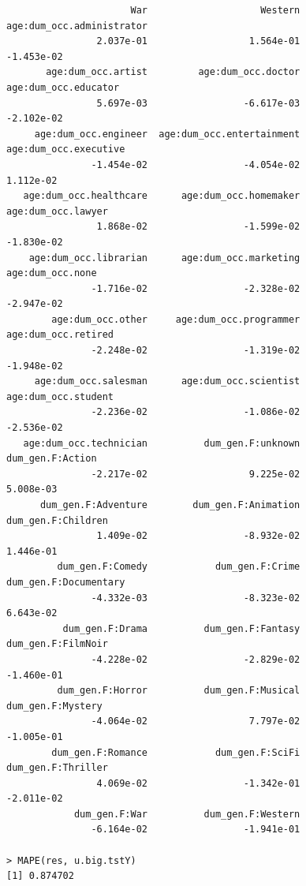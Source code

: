 \documentclass[11pt]{article}
\begin{document}
\begin{verbatim}
                      War                    Western  age:dum_occ.administrator  
                2.037e-01                  1.564e-01                 -1.453e-02  
       age:dum_occ.artist         age:dum_occ.doctor       age:dum_occ.educator  
                5.697e-03                 -6.617e-03                 -2.102e-02  
     age:dum_occ.engineer  age:dum_occ.entertainment      age:dum_occ.executive  
               -1.454e-02                 -4.054e-02                  1.112e-02  
   age:dum_occ.healthcare      age:dum_occ.homemaker         age:dum_occ.lawyer  
                1.868e-02                 -1.599e-02                 -1.830e-02  
    age:dum_occ.librarian      age:dum_occ.marketing           age:dum_occ.none  
               -1.716e-02                 -2.328e-02                 -2.947e-02  
        age:dum_occ.other     age:dum_occ.programmer        age:dum_occ.retired  
               -2.248e-02                 -1.319e-02                 -1.948e-02  
     age:dum_occ.salesman      age:dum_occ.scientist        age:dum_occ.student  
               -2.236e-02                 -1.086e-02                 -2.536e-02  
   age:dum_occ.technician          dum_gen.F:unknown           dum_gen.F:Action  
               -2.217e-02                  9.225e-02                  5.008e-03  
      dum_gen.F:Adventure        dum_gen.F:Animation         dum_gen.F:Children  
                1.409e-02                 -8.932e-02                  1.446e-01  
         dum_gen.F:Comedy            dum_gen.F:Crime      dum_gen.F:Documentary  
               -4.332e-03                 -8.323e-02                  6.643e-02  
          dum_gen.F:Drama          dum_gen.F:Fantasy         dum_gen.F:FilmNoir  
               -4.228e-02                 -2.829e-02                 -1.460e-01  
         dum_gen.F:Horror          dum_gen.F:Musical          dum_gen.F:Mystery  
               -4.064e-02                  7.797e-02                 -1.005e-01  
        dum_gen.F:Romance            dum_gen.F:SciFi         dum_gen.F:Thriller  
                4.069e-02                 -1.342e-01                 -2.011e-02  
            dum_gen.F:War          dum_gen.F:Western  
               -6.164e-02                 -1.941e-01
             
> MAPE(res, u.big.tstY)
[1] 0.874702
\end{verbatim}
\end{document}
